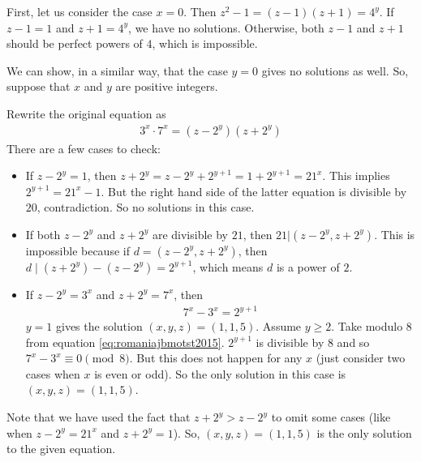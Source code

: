 \documentclass{subfile}
\begin{document}
				\begin{solution}
					First, let us consider the case $x=0$. Then $z^2-1 =(z-1)(z+1)=4^y$. If $z-1=1$ and $z+1=4^y$, we have no solutions. Otherwise, both $z-1$ and $z+1$ should be perfect powers of $4$, which is impossible.

					We can show, in a similar way, that the case $y=0$ gives no solutions as well. So, suppose that $x$ and $y$ are positive integers.

					Rewrite the original equation as
						\begin{align*}
							3^x \cdot 7^x = (z-2^y)(z+2^y)
						\end{align*}
					There are a few cases to check:
						\begin{itemize}
							\item If $z-2^y=1$, then $z+2^y = z-2^y+2^{y+1}=1+2^{y+1}=21^x$. This implies $2^{y+1}=21^x-1$. But the right hand side of the latter equation is divisible by $20$, contradiction. So no solutions in this case.

							\item If both $z-2^y$ and $z+2^y$ are divisible by $21$, then $21|(z-2^y, z+2^y)$. This is impossible because if $d=(z-2^y, z+2^y)$, then $d\mid (z+2^y) -(z-2^y)=2^{y+1}$, which means $d$ is a power of $2$.

							\item If $z-2^y=3^x$ and $z+2^y=7^x$, then
								\begin{align}\label{eq:romaniajbmotst2015}
									7^x-3^x=2^{y+1}
								\end{align}
							 $y=1$ gives the solution $(x,y,z)=(1,1,5)$. Assume $y \geq 2$. Take modulo $8$ from equation \eqref{eq:romaniajbmotst2015}. $2^{y+1}$ is divisible by $8$ and so $7^x-3^x \equiv 0 \pmod 8$. But this does not happen for any $x$ (just consider two cases when $x$ is even or odd). So the only solution in this case is $(x,y,z)=(1,1,5)$.
						\end{itemize}
					Note that we have used the fact that $z+2^y > z-2^y$ to omit some cases (like when $z-2^y=21^x$ and $z+2^y = 1$). So, $(x,y,z)=(1,1,5)$ is the only solution to the given equation.
				\end{solution}
\end{document}

